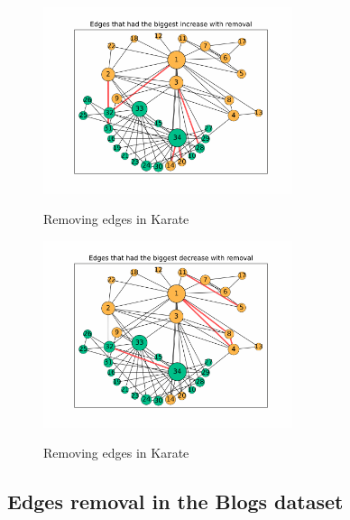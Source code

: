 \begin{figure}[H]
	\centering
	\includegraphics[width=0.65\textwidth]{Figures/karate_increase}
	\label{fig:karate_increase}
	\caption{Removing edges in Karate}
\end{figure}

\begin{figure}[H]
	\centering
	\includegraphics[width=0.65\textwidth]{Figures/karate_decrease}
	\label{fig:karate_decrease}
	\caption{Removing edges in Karate}
\end{figure}


\subsection{Edges removal in the Blogs dataset}

